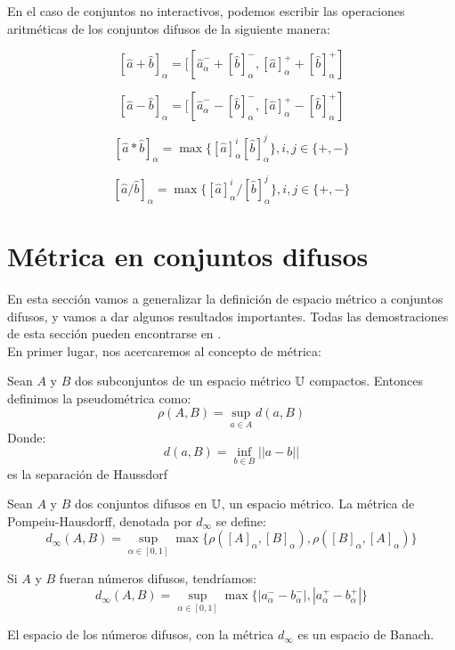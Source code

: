 \begin{ejemplo}
En el caso de conjuntos no interactivos, podemos escribir las operaciones aritméticas de los conjuntos difusos de la siguiente manera:

\[
[\hat{a} + \hat{b}]_\alpha = [[\hat{a}^-_\alpha + [\hat{b}]_\alpha^-, [\hat{a}]^+_\alpha + [\hat{b}]_\alpha^+]
\]

\[
[\hat{a} - \hat{b}]_\alpha = [[\hat{a}^-_\alpha - [\hat{b}]_\alpha^-, [\hat{a}]^+_\alpha - [\hat{b}]_\alpha^+]
\]

\[
[\hat{a} * \hat{b}]_\alpha = \max\{ [\hat{a}]_\alpha^i [\hat{b}]^j_\alpha \}, i, j \in \{+, -\}
\]

\[
[\hat{a} / \hat{b}]_\alpha = \max\{ [\hat{a}]_\alpha^i / [\hat{b}]^j_\alpha \}, i, j \in \{+, -\}
\]
\end{ejemplo}

\section{Métrica en conjuntos difusos}
En esta sección vamos a generalizar la definición de espacio métrico a conjuntos difusos, y vamos a dar algunos resultados importantes. Todas las demostraciones de esta sección pueden encontrarse en \cite{apuntesfuzzy}. \\
En primer lugar, nos acercaremos al concepto de métrica:

\begin{definicion}[Pseudométrica]
	Sean $A$ y $B$ dos subconjuntos de un espacio métrico $\mathbb U$ compactos. Entonces definimos la pseudométrica como:
	\[
		\rho(A, B) = \sup\limits_{a \in A} d(a, B)
	\]
	Donde:
	\[
		d(a, B) = \inf\limits_{b \in B} ||a-b||
	\]
	es la separación de Haussdorf
\end{definicion}

\begin{definicion}
	\label{def:metricadifusa}
	Sean $A$ y $B$ dos conjuntos difusos en $\mathbb U$, un espacio métrico. La métrica de Pompeiu-Hausdorff, denotada por $d_\infty$ se define:
	\[
		d_\infty(A, B) = \sup\limits_{\alpha \in [0, 1]} \max\{\rho([A]_\alpha, [B]_\alpha), \rho([B]_\alpha,  [A]_\alpha)\}
	\]
	
	Si $A$ y $B$ fueran números difusos, tendríamos:
	\[
		d_\infty(A, B) = \sup\limits_{\alpha \in [0, 1]} \max\{|a_\alpha^- - b_\alpha^-|, |a_\alpha^+ - b_\alpha^+|\}
	\]
\end{definicion}

\begin{teorema}
	\label{teorema:banach}
	El espacio de los números difusos, con la métrica $d_\infty$ es un espacio de Banach.
\end{teorema}